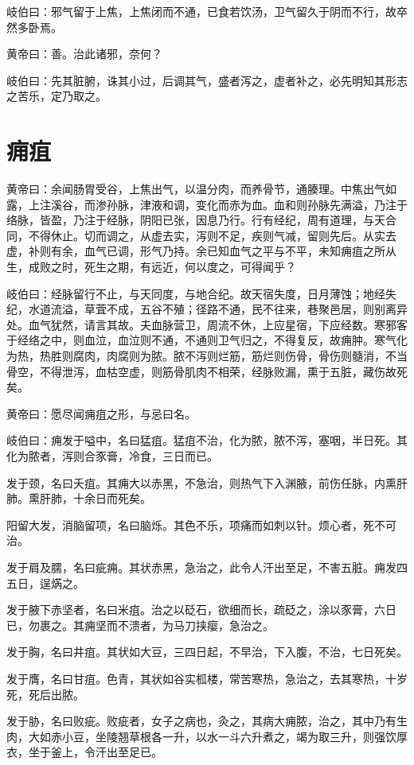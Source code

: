 \documentclass[a4paper,12pt,UTF8,twoside]{ctexbook}
\begin{document}
	岐伯曰：邪气留于上焦，上焦闭而不通，已食若饮汤，卫气留久于阴而不行，故卒然多卧焉。
	
	黄帝曰：善。治此诸邪，奈何？
	
	岐伯曰：先其脏腑，诛其小过，后调其气，盛者泻之，虚者补之，必先明知其形志之苦乐，定乃取之。
	
	\chapter{痈疽}
	
	黄帝曰：余闻肠胃受谷，上焦出气，以温分肉，而养骨节，通腠理。中焦出气如露，上注溪谷，而渗孙脉，津液和调，变化而赤为血。血和则孙脉先满溢，乃注于络脉，皆盈，乃注于经脉，阴阳已张，因息乃行。行有经纪，周有道理，与天合同，不得休止。切而调之，从虚去实，泻则不足，疾则气减，留则先后。从实去虚，补则有余，血气已调，形气乃持。余已知血气之平与不平，未知痈疽之所从生，成败之时，死生之期，有远近，何以度之，可得闻乎？
	
	岐伯曰：经脉留行不止，与天同度，与地合纪。故天宿失度，日月薄蚀；地经失纪，水道流溢，草萓不成，五谷不殖；径路不通，民不往来，巷聚邑居，则别离异处。血气犹然，请言其故。夫血脉营卫，周流不休，上应星宿，下应经数。寒邪客于经络之中，则血泣，血泣则不通，不通则卫气归之，不得复反，故痈肿。寒气化为热，热胜则腐肉，肉腐则为脓。脓不泻则烂筋，筋烂则伤骨，骨伤则髓消，不当骨空，不得泄泻，血枯空虚，则筋骨肌肉不相荣，经脉败漏，熏于五脏，藏伤故死矣。
	
	黄帝曰：愿尽闻痈疽之形，与忌曰名。
	
	岐伯曰：痈发于嗌中，名曰猛疽。猛疽不治，化为脓，脓不泻，塞咽，半日死。其化为脓者，泻则合豕膏，冷食，三日而已。
	
	发于颈，名曰夭疽。其痈大以赤黑，不急治，则热气下入渊腋，前伤任脉，内熏肝肺。熏肝肺，十余日而死矣。
	
	阳留大发，消脑留项，名曰脑烁。其色不乐，项痛而如刺以针。烦心者，死不可治。
	
	发于肩及臑，名曰疵痈。其状赤黑，急治之，此令人汗出至足，不害五脏。痈发四五日，逞焫之。
	
	发于腋下赤坚者，名曰米疽。治之以砭石，欲细而长，疏砭之，涂以豕膏，六日已，勿裹之。其痈坚而不溃者，为马刀挟瘿，急治之。
	
	发于胸，名曰井疽。其状如大豆，三四日起，不早治，下入腹，不治，七日死矣。
	
	发于膺，名曰甘疽。色青，其状如谷实柧楼，常苦寒热，急治之，去其寒热，十岁死，死后出脓。
	
	发于胁，名曰败疵。败疵者，女子之病也，灸之，其病大痈脓，治之，其中乃有生肉，大如赤小豆，坐陵翘草根各一升，以水一斗六升煮之，竭为取三升，则强饮厚衣，坐于釜上，令汗出至足已。
	
\end{document}
